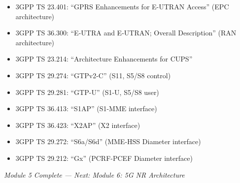 
\begin{itemize}
\tightlist
\item
  3GPP TS 23.401: ``GPRS Enhancements for E-UTRAN Access'' (EPC architecture)
\item
  3GPP TS 36.300: ``E-UTRA and E-UTRAN; Overall Description'' (RAN architecture)
\item
  3GPP TS 23.214: ``Architecture Enhancements for CUPS''
\item
  3GPP TS 29.274: ``GTPv2-C'' (S11, S5/\allowbreak{}S8 control)
\item
  3GPP TS 29.281: ``GTP-U'' (S1-U, S5/\allowbreak{}S8 user)
\item
  3GPP TS 36.413: ``S1AP'' (S1-MME interface)
\item
  3GPP TS 36.423: ``X2AP'' (X2 interface)
\item
  3GPP TS 29.272: ``S6a/\allowbreak{}S6d'' (MME-HSS Diameter interface)
\item
  3GPP TS 29.212: ``Gx'' (PCRF-PCEF Diameter interface)
\end{itemize}

\emph{Module 5 Complete — Next: Module 6: 5G NR Architecture}
